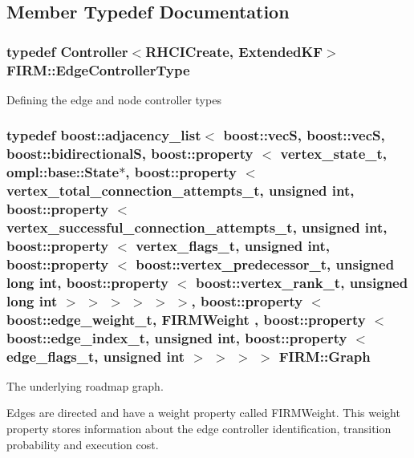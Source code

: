 \subsection{\-Member \-Typedef \-Documentation}
\hypertarget{class_f_i_r_m_a70abcb24fbc9f836b94119f65c8f8a37}{
\subsubsection[{\-Edge\-Controller\-Type}]{\setlength{\rightskip}{0pt plus 5cm}typedef {\bf \-Controller}$<${\bf \-R\-H\-C\-I\-Create}, {\bf \-Extended\-K\-F}$>$ {\bf \-F\-I\-R\-M\-::\-Edge\-Controller\-Type}}}\label{class_f_i_r_m_a70abcb24fbc9f836b94119f65c8f8a37}
\-Defining the edge and node controller types \hypertarget{class_f_i_r_m_a687e9f4243b22c30ee1fa5da22a85053}{
\subsubsection[{\-Graph}]{\setlength{\rightskip}{0pt plus 5cm}typedef boost\-::adjacency\-\_\-list$<$ boost\-::vec\-S, boost\-::vec\-S, boost\-::bidirectional\-S, boost\-::property $<$ {\bf vertex\-\_\-state\-\_\-t}, ompl\-::base\-::\-State$\ast$, boost\-::property $<$ {\bf vertex\-\_\-total\-\_\-connection\-\_\-attempts\-\_\-t}, unsigned int, boost\-::property $<$ {\bf vertex\-\_\-successful\-\_\-connection\-\_\-attempts\-\_\-t}, unsigned int, boost\-::property $<$ {\bf vertex\-\_\-flags\-\_\-t}, unsigned int, boost\-::property $<$ boost\-::vertex\-\_\-predecessor\-\_\-t, unsigned long int, boost\-::property $<$ boost\-::vertex\-\_\-rank\-\_\-t, unsigned long int $>$ $>$ $>$ $>$ $>$ $>$, boost\-::property $<$ boost\-::edge\-\_\-weight\-\_\-t, {\bf \-F\-I\-R\-M\-Weight} , boost\-::property $<$ boost\-::edge\-\_\-index\-\_\-t, unsigned int, boost\-::property $<$ {\bf edge\-\_\-flags\-\_\-t}, unsigned int $>$ $>$ $>$ $>$ {\bf \-F\-I\-R\-M\-::\-Graph}}}\label{class_f_i_r_m_a687e9f4243b22c30ee1fa5da22a85053}


\-The underlying roadmap graph. 

\begin{DoxyParagraph}{\-Edges are directed and have a weight property called \-F\-I\-R\-M\-Weight. \-This weight property}
stores information about the edge controller identification, transition probability and execution cost. 
\end{DoxyParagraph}


